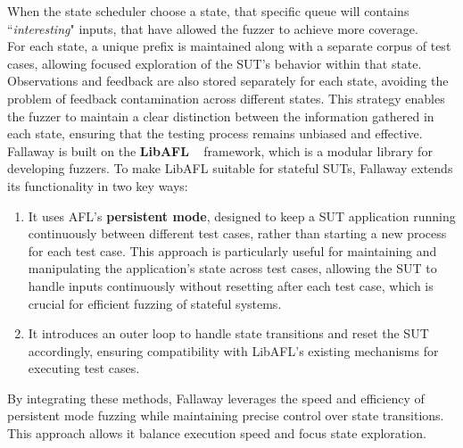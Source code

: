 When the state scheduler choose a state, that specific queue will contains ``\textit{interesting}" inputs, that have allowed the fuzzer to achieve more coverage.
\\For each state, a unique prefix is maintained along with a separate corpus of test cases, allowing focused exploration of the SUT's behavior within that state. Observations and feedback are also stored separately for each state, avoiding the problem of feedback contamination across different states. This strategy enables the fuzzer to maintain a clear distinction between the information gathered in each state, ensuring that the testing process remains unbiased and effective.
\\Fallaway is built on the \textbf{LibAFL} ~\cite{libafl} framework, which is a modular library for developing fuzzers. To make LibAFL suitable for stateful SUTs, Fallaway extends its functionality in two key ways:
\begin{enumerate}
    \item It uses AFL's \textbf{persistent mode}, designed to keep a SUT application running continuously between different test cases, rather than starting a new process for each test case. This approach is particularly useful for maintaining and manipulating the application's state across test cases, allowing the SUT to handle inputs continuously without resetting after each test case, which is crucial for efficient fuzzing of stateful systems.
    \item It introduces an outer loop to handle state transitions and reset the SUT accordingly, ensuring compatibility with LibAFL's existing mechanisms for executing test cases.
\end{enumerate}  
By integrating these methods, Fallaway leverages the speed and efficiency of persistent mode fuzzing while maintaining precise control over state transitions. This approach allows it balance execution speed and focus state exploration.
